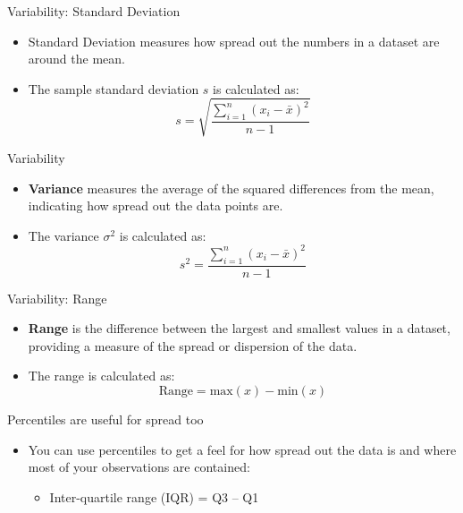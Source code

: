 \documentclass[
  ignorenonframetext,
]{beamer}
\providecommand{\tightlist}{%
  \setlength{\itemsep}{0pt}\setlength{\parskip}{0pt}}
\begin{document}
\begin{frame}{Variability: Standard Deviation}
\label{variability-standard-deviation}
\begin{itemize}
\tightlist
\item
  Standard Deviation measures how spread out the numbers in a dataset
  are around the mean.
\end{itemize}

\begin{itemize}
\tightlist
\item
  The sample standard deviation \(s\) is calculated as:
  \[s = \sqrt{\frac{\sum_{i=1}^{n} (x_i - \bar{x})^2}{n - 1}}\]
\end{itemize}
\end{frame}

\begin{frame}{Variability}
\label{variability-1}
\begin{itemize}
\tightlist
\item
  \textbf{Variance} measures the average of the squared differences from
  the mean, indicating how spread out the data points are.
\end{itemize}

\begin{itemize}
\tightlist
\item
  The variance \(\sigma^2\) is calculated as:
  \[s^2 = \frac{\sum_{i=1}^{n} (x_i - \bar{x})^2}{n - 1}\]
\end{itemize}
\end{frame}

\begin{frame}{Variability: Range}
\label{variability-range}
\begin{itemize}
\tightlist
\item
  \textbf{Range} is the difference between the largest and smallest
  values in a dataset, providing a measure of the spread or dispersion
  of the data.
\end{itemize}

\begin{itemize}
\tightlist
\item
  The range is calculated as:
  \[\text{Range} = \text{max}(x) - \text{min}(x)\]
\end{itemize}
\end{frame}

\begin{frame}{Percentiles are useful for spread too}
\label{percentiles-are-useful-for-spread-too}
\begin{itemize}
\item
  You can use percentiles to get a feel for how spread out the data is
  and where most of your observations are contained:

  \begin{itemize}
  \tightlist
  \item
    Inter-quartile range (IQR) = Q3 -- Q1
  \end{itemize}
\end{itemize}
\end{frame}
\end{document}
